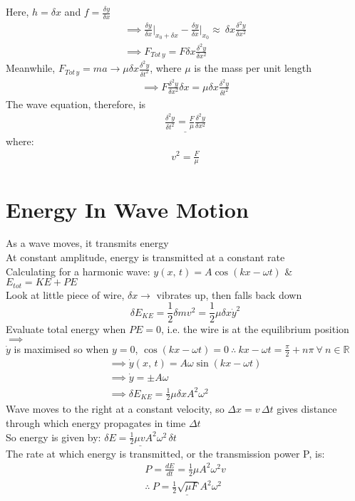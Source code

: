 \documentclass[a4paper, 11pt, fleqn, normalem]{report}
\begin{document}
Here, $h = {\delta}x$ and $f = \frac{{\delta}y}{{\delta}x}$
\begin{gather*}
    \implies \frac{{\delta}y}{{\delta}x}\Big|_{x_{0} + {\delta}x} - \frac{{\delta}y}{{\delta}x}\Big|_{x_{0}} \approx~ \delta x \frac{\delta^{2}y}{\delta x^{2}} \\
    \implies F_{Tot\,y} = F\delta x\frac{\delta^{2}y}{\delta x^{2}}
\end{gather*}
Meanwhile, $F_{Tot\,y} = ma \rightarrow \mu\delta x \frac{\delta^{2}y}{\delta t^{2}}$, where $\mu$ is the mass per unit length
\begin{gather*}
    \implies F\frac{\delta^{2}y}{\delta x^{2}} \delta x = \mu\delta x\frac{\delta^{2}y}{\delta t^{2}}
\end{gather*}
The wave equation, therefore, is
\begin{gather*}
    \underline{\frac{\delta^{2}y}{\delta t^{2}} = \frac{F}{\mu}\frac{\delta^{2}y}{\delta x^{2}}}
\end{gather*}
where:
\begin{gather*}
    v^{2} = \frac{F}{\mu}
\end{gather*}

\section{Energy In Wave Motion}
As a wave moves, it transmits energy \\
At constant amplitude, energy is transmitted at a constant rate \\
Calculating for a harmonic wave: $y(x,\,t) = A\cos{(kx - \omega t)}$ \& $E_{tot} = KE + PE$ \\
Look at little piece of wire, $\delta x \rightarrow$ vibrates up, then falls back down
\begin{equation*}
    \delta E_{KE} = \frac{1}{2}\delta mv^{2} = \frac{1}{2}\mu\delta x\dot{y}^{2}
\end{equation*}
Evaluate total energy when $PE = 0$, i.e. the wire is at the equilibrium position $\implies$ \\
$\dot{y}$ is maximised so when $y = 0$, $\cos{(kx - \omega t)} = 0 ~\therefore~ kx - \omega t = \frac{\pi}{2} + n\pi ~\forall~ n \in \mathbb{R}$
\begin{gather*}
    \implies \dot{y}(x,\,t) = A\omega\sin{(kx - \omega t)} \\
    \implies \dot{y} = \pm A\omega \\
    \implies \delta E_{KE} = \frac{1}{2}\mu\delta xA^{2}\omega^{2}
\end{gather*}
Wave moves to the right at a constant velocity, so $\Delta x = v \,\Delta t$ gives distance through which energy propagates in time $\Delta t$ \\
So energy is given by: $\underline{\delta E = \frac{1}{2}\mu vA^{2}\omega^{2}\,\delta t}$ \\
The rate at which energy is transmitted, or the transmission power P, is:
\begin{gather*}
    P = \frac{dE}{dt} = \frac{1}{2}\mu A^{2}\omega^{2}v \\
    \therefore ~\underline{P = \frac{1}{2}\sqrt{\mu F}A^{2}\omega^{2}}
\end{gather*}
\end{document}
